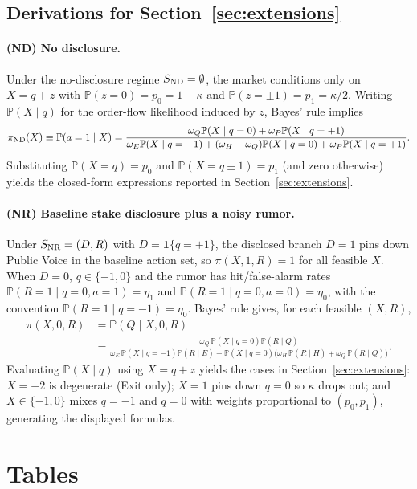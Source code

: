 \documentclass[11pt]{article}
\newcommand{\PP}{\mathbb{P}}
\newcommand{\1}{\mathbf{1}}
\begin{document}
\subsection{Derivations for Section~\ref{sec:extensions}}
\label{app:extensions-derivations}

\paragraph{(ND) No disclosure.}
Under the no-disclosure regime $S_{\textup{ND}}=\emptyset$, the market conditions only on $X=q+z$ with
$\PP(z=0)=p_0=1-\kappa$ and $\PP(z=\pm1)=p_1=\kappa/2$. Writing $\PP(X \mid q)$ for the order-flow likelihood induced by $z$, Bayes' rule implies
\[
\pi_{\textup{ND}}(X)\equiv \PP(a=1 \mid X)
=\frac{\omega_Q\PP(X \mid q=0)+\omega_P\PP(X \mid q=+1)}
{\omega_E\PP(X \mid q=-1)+(\omega_H+\omega_Q)\PP(X \mid q=0)+\omega_P\PP(X \mid q=+1)}.
\]
Substituting $\PP(X=q)=p_0$ and $\PP(X=q\pm1)=p_1$ (and zero otherwise) yields the closed-form expressions reported in Section~\ref{sec:extensions}.

\paragraph{(NR) Baseline stake disclosure plus a noisy rumor.}
Under $S_{\textup{NR}}=(D,R)$ with $D=\1\{q=+1\}$, the disclosed branch $D=1$ pins down Public Voice in the baseline action set, so $\pi(X,1,R)=1$ for all feasible $X$.
When $D=0$, $q\in\{-1,0\}$ and the rumor has hit/false-alarm rates $\PP(R=1 \mid q=0,a=1)=\eta_1$ and $\PP(R=1 \mid q=0,a=0)=\eta_0$, with the convention $\PP(R=1 \mid q=-1)=\eta_0$.
Bayes' rule gives, for each feasible $(X,R)$,
\begin{align*}
\pi(X,0,R)
&=\PP(Q \mid X,0,R)\\
&=\frac{\omega_Q\,\PP(X \mid q=0)\PP(R \mid Q)}
{\omega_E\,\PP(X \mid q=-1)\PP(R \mid E)+\PP(X \mid q=0)\big(\omega_H\,\PP(R \mid H)+\omega_Q\,\PP(R \mid Q)\big)}.
\end{align*}
Evaluating $\PP(X \mid q)$ using $X=q+z$ yields the cases in Section~\ref{sec:extensions}: $X=-2$ is degenerate (Exit only); $X=1$ pins down $q=0$ so $\kappa$ drops out; and $X\in\{-1,0\}$ mixes $q=-1$ and $q=0$ with weights proportional to $(p_0,p_1)$, generating the displayed formulas.

\section{Tables}
\label{app:tables}
\end{document}
